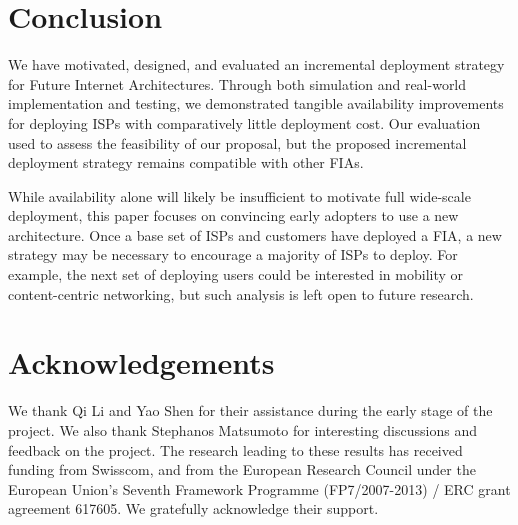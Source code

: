 \section{Conclusion}
\label{sec:conclusion}

We have motivated, designed, and evaluated an incremental deployment strategy
for Future Internet Architectures. Through both simulation and real-world
implementation and testing, we demonstrated tangible availability improvements
for deploying ISPs with comparatively little deployment cost. Our evaluation
used \scion to assess the feasibility of our proposal, but the proposed
incremental deployment strategy remains compatible with other FIAs. 

While availability alone will likely be insufficient to motivate full
wide-scale deployment, this paper focuses on convincing early adopters to use a
new architecture. Once a base set of ISPs and customers have deployed a FIA, a
new strategy may be necessary to encourage a majority of ISPs to deploy. For
example, the next set of deploying users could be interested in mobility or
content-centric networking, but such analysis is left open to future research.

\section{Acknowledgements}

We thank Qi Li and Yao Shen for their assistance during the early stage of the
project. We also thank Stephanos Matsumoto for interesting discussions and
feedback on the project. The research leading to these results has received
funding from Swisscom, and from the European Research Council under the
European Union's Seventh Framework Programme (FP7/2007-2013) / ERC grant
agreement 617605. We gratefully acknowledge their support.



